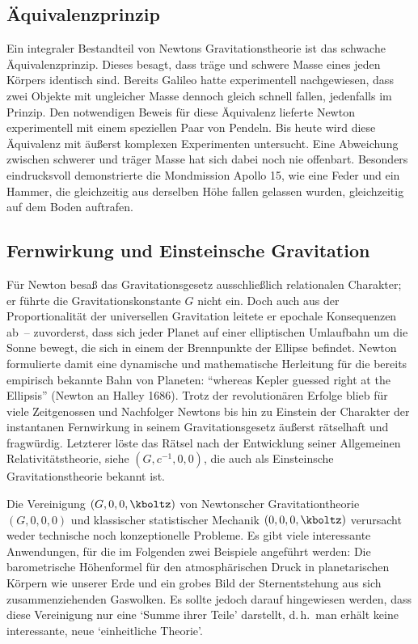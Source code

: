 \documentclass{scrartcl}
\begin{document}
\subsection*{Äquivalenzprinzip}

Ein integraler Bestandteil von Newtons Gravitationstheorie ist das schwache Äquivalenzprinzip. Dieses besagt, dass träge und schwere Masse eines jeden Körpers identisch sind. Bereits Galileo hatte experimentell nachgewiesen, dass zwei Objekte mit ungleicher Masse dennoch gleich schnell fallen, jedenfalls im Prinzip. Den notwendigen Beweis für diese Äquivalenz lieferte Newton experimentell mit einem speziellen Paar von Pendeln. Bis heute wird diese Äquivalenz mit äußerst komplexen Experimenten untersucht. Eine Abweichung zwischen schwerer und träger Masse hat sich dabei noch nie offenbart. Besonders eindrucksvoll demonstrierte die Mondmission Apollo 15, wie eine Feder und ein Hammer, die gleichzeitig aus derselben Höhe fallen gelassen wurden, gleichzeitig auf dem Boden auftrafen.


\subsection*{Fernwirkung und Einsteinsche Gravitation}

Für Newton besaß das Gravitationsgesetz ausschließlich relationalen Charakter; er führte die Gravitationskonstante $G$ nicht ein. Doch auch aus der Proportionalität der universellen Gravitation leitete er epochale Konsequenzen ab~-- zuvorderst, dass sich jeder Planet auf einer elliptischen Umlaufbahn um die Sonne bewegt, die sich in einem der Brennpunkte der Ellipse befindet. Newton formulierte damit eine dynamische und mathematische Herleitung für die bereits empirisch bekannte Bahn von Planeten: \enquote{whereas Kepler guessed right at the Ellipsis} (Newton an Halley 1686). Trotz der revolutionären Erfolge blieb für viele Zeitgenossen und Nachfolger Newtons bis hin zu Einstein der Charakter der instantanen Fernwirkung in seinem Gravitationsgesetz äußerst rätselhaft und fragwürdig. Letzterer löste das Rätsel nach der Entwicklung seiner Allgemeinen Relativitätstheorie, siehe $(G,c^{-1},0,0)$, die auch als Einsteinsche Gravitationstheorie bekannt ist.


\newpage {}
\label{sec:1001}

Die Vereinigung $(G,0,0,\kboltz)$ von Newtonscher Gravitationtheorie $(G,0,0,0)$ und klassischer statistischer Mechanik $(0,0,0,\kboltz)$ verursacht weder technische noch konzeptionelle Probleme. Es gibt viele interessante Anwendungen, für die im Folgenden zwei Beispiele angeführt werden: Die barometrische Höhenformel für den atmosphärischen Druck in planetarischen Körpern wie unserer Erde und ein grobes Bild der Sternentstehung aus sich zusammenziehenden Gaswolken. Es sollte jedoch darauf hingewiesen werden, dass diese Vereinigung nur eine \enquote*{Summe ihrer Teile} darstellt, d.\,h.\ man erhält keine interessante, neue \enquote*{einheitliche Theorie}.
\end{document}
